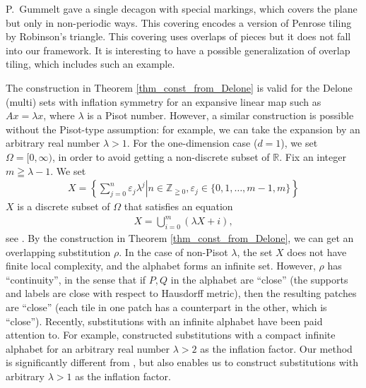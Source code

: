 \documentclass[a4]{amsart}
\theoremstyle{definition}
\begin{document}
P.~Gummelt \cite{Gummelt:96} gave a single decagon with special markings, which covers the plane but only in non-periodic ways. This 
covering encodes a version of Penrose tiling by Robinson's triangle.
This covering uses overlaps of pieces but it does not fall into our framework. It is interesting to have a possible generalization of overlap tiling, which includes such an example.

The construction in Theorem \ref{thm_const_from_Delone} is valid for the Delone (multi) sets with inflation symmetry for an expansive linear map such as $Ax=\lambda x$, where $\lambda$ is a Pisot number. However, a similar construction is possible without the Pisot-type assumption: for example, we can take the expansion by an arbitrary real number $\lambda>1$.
For the one-dimension case ($d=1$), we set $\Omega=[0,\infty)$, in order to avoid getting a 
non-discrete subset of $\mathbb{R}$.
 Fix an integer $m\geqq\lambda-1$.
We set
\begin{align*}
 X=\left.\left\{\sum_{j=0}^n\varepsilon_j\lambda^j\right| n\in\mathbb{Z}_{\geqq 0},\varepsilon_j\in\{0,1,\ldots ,m-1,m\} \right\}
\end{align*}
$X$ is a discrete subset of $\Omega$ that satisfies an equation
\begin{align*}
 X=\bigcup_{i=0}^m(\lambda X+i),
\end{align*}
see \cite{Feng-Wen:02}.
By the construction in Theorem \ref{thm_const_from_Delone}, we can get an overlapping substitution $\rho$.
In the case of non-Pisot $\lambda$, the set
 $X$ does not have finite local complexity, and the alphabet forms an infinite set.
However, $\rho$ has ``continuity'', in the sense that if $P,Q$ in the alphabet are ``close''
(the supports and labels are close with respect to Hausdorff metric), then
the resulting patches are ``close'' (each tile in one patch has a counterpart in the other, which is
``close''). Recently, substitutions with an infinite alphabet have been paid attention to.
For example, \cite{FGM} constructed substitutions with a compact infinite alphabet for an arbitrary
real number $\lambda>2$ as the inflation factor.
Our method is significantly different from \cite{FGM}, but also enables us to
construct substitutions with arbitrary $\lambda>1$ as the inflation factor.

\end{document}
